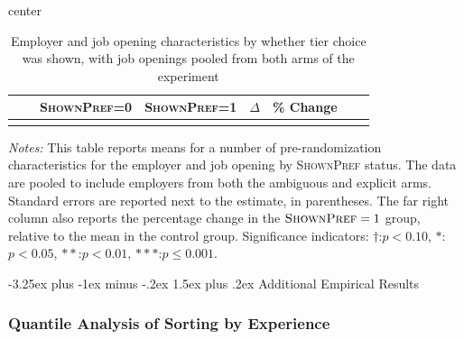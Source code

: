 \documentclass[12pt]{article}
\makeatletter
\renewcommand{\subsection}{%
  \@startsection{subsection}{2}{\z@}%
  {-3.25ex plus -1ex minus -.2ex}%
  {1.5ex plus .2ex}%
  {\normalfont\large\bfseries}%
}
\newcommand{\starlanguage}{Significance indicators: $\dagger$:$p < 0.10$, $*$:$p < 0.05$, $**$:$p < 0.01$, $***$:$p \le 0.001$.}
\makeatother
\begin{document}
\begin{table}[h!]
\begin{center}
\caption{Employer and job opening characteristics by whether tier choice was shown, with job openings pooled from both arms of the experiment}
\label{tab:balance_big}
\begin{small}
\begin{adjustbox}{center}
\begin{tabular}{lllccccc}
\toprule
&   & \multicolumn{1}{c}{\parbox[t][][t]{2.3cm}{{\footnotesize \textsc{ShownPref}=0}}}
&     \multicolumn{1}{c}{\parbox[t][][t]{2.3cm}{\footnotesize  \textsc{ShownPref=1}}}
&     \multicolumn{1}{c}{\parbox[t][][t]{2.0cm}{$\Delta$}}
&     \multicolumn{1}{c}{\parbox[t][][t]{1cm}{\% Change}}
\\
\hline

 \\
\bottomrule
\end{tabular}
\end{adjustbox}
\end{small}
\end{center}
\begin{minipage}{1.0 \textwidth}
\begin{footnotesize}
\begin{singlespace}
  \emph{Notes:} This table reports means for a number of pre-randomization characteristics for the employer and job opening by \textsc{ShownPref} status.
  The data are pooled to include employers from both the ambiguous and explicit arms.
Standard errors are reported next to the estimate, in parentheses.
The far right column also reports the percentage change in the $\textsc{ShownPref}=1$ group, relative to the mean in the control group. 
\starlanguage
\end{singlespace}
\end{footnotesize}
\end{minipage}
\end{table}




\subsection{Additional Empirical Results}



\subsubsection{Quantile Analysis of Sorting by Experience}
\label{online_app:empirical_analysis}
\end{document}
